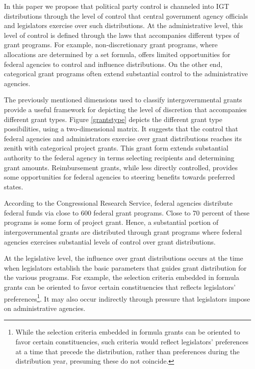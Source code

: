 In this paper we propose that political party control is channeled into IGT distributions through the level of control that central government agency officials and legislators exercise over such distributions. At the administrative level, this level of control is defined through the laws that accompanies different types of grant programs. For example, non-discretionary grant programs, where allocations are determined by a set formula, offers limited opportunities for federal agencies to control and influence distributions. On the other end, categorical grant programs often extend substantial control to the administrative agencies.

The previously mentioned dimensions used to classify intergovernmental grants provide a useful framework for depicting the level of discretion that accompanies different grant types. Figure \ref{grantstype} depicts the different grant type possibilities, using a two-dimensional matrix. It suggests that the control that federal agencies and administrators exercise over grant distributions reaches its zenith with categorical project grants. This grant form extends substantial authority to the federal agency in terms selecting recipients and determining grant amounts. Reimbursement grants, while less directly controlled, provides some opportunities for federal agencies to steering benefits towards preferred states.

According to the Congressional Research Service, federal agencies distribute federal funds via close to 600 federal grant programs\parencite{dilger2015federal}. Close to 70 percent of these programs is some form of project grant\parencite{dilger2015federal}. Hence, a substantial portion of intergovernmental grants are distributed through grant programs where federal agencies exercises substantial levels of control over grant distributions.

At the legislative level, the influence over grant distributions occurs at the time when legislators establish the basic parameters that guides grant distribution for the various programs. For example, the selection criteria embedded in formula grants can be oriented to favor certain constituencies that reflects legislators' preferences\footnote{While the selection criteria embedded in formula grants can be oriented to favor certain constituencies, such criteria would reflect legislators' preferences at a time that precede the distribution, rather than preferences during the distribution year, presuming these do not coincide.}. It may also occur indirectly through pressure that legislators impose on administrative agencies.

